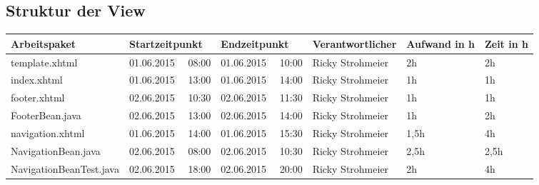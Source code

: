 \begin{landscape}
	\subsection{Struktur der View}
	\begin{tabular}{|p{10.3cm}|p{3.2cm}|p{3.2cm}|p{3.5cm}|p{1.7cm}|p{1.5cm}|}
		\hline  \textbf{Arbeitspaket} & \textbf{Startzeitpunkt} & \textbf{Endzeitpunkt} & \textbf{Verantwortlicher}  & \textbf{Aufwand in h} & \textbf{Zeit in h}\\ 
		\hline   template.xhtml                   & 01.06.2015 \ \ 08:00     & 01.06.2015 \ \ 10:00     & Ricky Strohmeier &      2h    &    2h  \\
		\hline   index.xhtml                      & 01.06.2015 \ \ 13:00     & 01.06.2015 \ \ 14:00     & Ricky Strohmeier &      1h    &    1h  \\
		\hline   footer.xhtml                     & 02.06.2015 \ \ 10:30     & 02.06.2015 \ \ 11:30     & Ricky Strohmeier &      1h    &    1h\\ 
		\hline   FooterBean.java                  & 02.06.2015 \ \ 13:00     & 02.06.2015 \ \ 14:00     & Ricky Strohmeier &      1h    &    2h\\ 
		\hline   navigation.xhtml                 & 01.06.2015 \ \ 14:00     & 01.06.2015 \ \ 15:30     & Ricky Strohmeier &      1,5h  &     4h \\ 
		\hline   NavigationBean.java              & 02.06.2015 \ \ 08:00     & 02.06.2015 \ \ 10:30     & Ricky Strohmeier &      2,5h  &    2,5h\\  
		\hline   NavigationBeanTest.java              & 02.06.2015 \ \ 18:00     & 02.06.2015 \ \ 20:00     & Ricky Strohmeier &      2h  &    4h\\ 
		\hline 
	\end{tabular} \ \\
	\ \\
	

\end{landscape}
